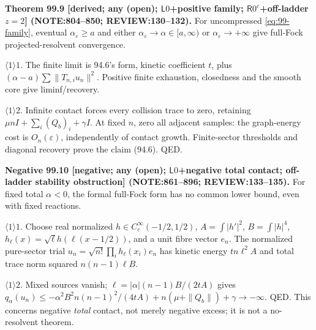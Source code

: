 \textbf{Theorem 99.9 [derived; any (open); \(\mathsf L0\)+positive family; \(\mathsf R0^c\)+off-ladder \(z=2\)]
(NOTE:804--850; REVIEW:130--132).}
For uncompressed \eqref{eq:99-family}, eventual \(\alpha_\varepsilon\ge a\) and either \(\alpha_\varepsilon\to\alpha\in[a,\infty)\)
or \(\alpha_\varepsilon\to+\infty\) give full-Fock projected-resolvent convergence.
\par\(\langle1\rangle1\). The finite limit is 94.6's form, kinetic coefficient \(t\), plus
\((\alpha-a)\sum\|T_{n,i}u_n\|^2\). Positive finite exhaustion, closedness and the smooth core give liminf/recovery.
\par\(\langle1\rangle2\). Infinite contact forces every collision trace to zero, retaining
\(\mu nI+\sum_i(Q_b)_i+\gamma I\). At fixed \(n\), zero all adjacent samples: the graph-energy cost is \(O_n(\varepsilon)\),
independently of contact growth. Finite-sector thresholds and diagonal recovery prove the claim (94.6). QED.

\textbf{Negative 99.10 [negative; any (open); \(\mathsf L0\)+negative total contact; off-ladder stability obstruction]
(NOTE:861--896; REVIEW:133--135).}
For fixed total \(\alpha<0\), the formal full-Fock form has no common lower bound, even with fixed reactions.
\par\(\langle1\rangle1\). Choose real normalized \(h\in C_c^\infty(-1/2,1/2)\), \(A=\int|h'|^2\), \(B=\int|h|^4\),
\(h_\ell(x)=\sqrt\ell h(\ell(x-1/2))\), and a unit fibre vector \(e_n\). The normalized pure-sector trial
\(u_n=\sqrt{n!}\prod_i h_\ell(x_i)e_n\) has kinetic energy \(tn\ell^2A\) and total trace norm squared \(n(n-1)\ell B\).
\par\(\langle1\rangle2\). Mixed sources vanish; \(\ell=|\alpha|(n-1)B/(2tA)\) gives
\(q_\alpha(u_n)\le-\alpha^2B^2n(n-1)^2/(4tA)+n(\mu+\|Q_b\|)+\gamma\to-\infty\). QED.
This concerns negative \emph{total} contact, not merely negative excess; it is not a no-resolvent theorem.


